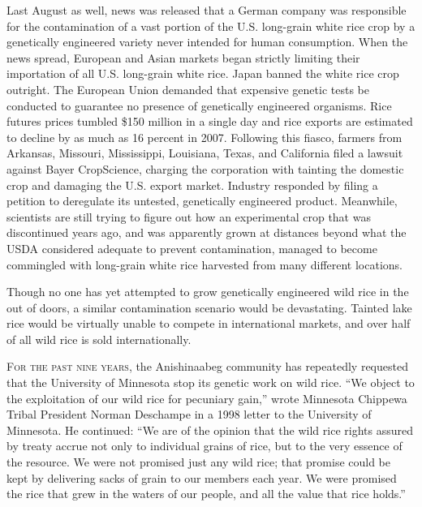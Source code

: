 Last August as well, news was released that a German company was
responsible for the contamination of a vast portion of the U.S.
long-grain white rice crop by a genetically engineered variety never
intended for human consumption. When the news spread, European and Asian
markets began strictly limiting their importation of all U.S. long-grain
white rice. Japan banned the white rice crop outright. The European
Union demanded that expensive genetic tests be conducted to guarantee no
presence of genetically engineered organisms. Rice futures prices
tumbled \$150 million in a single day and rice exports are estimated to
decline by as much as 16 percent in 2007. Following this fiasco, farmers
from Arkansas, Missouri, Mississippi, Louisiana, Texas, and California
filed a lawsuit against Bayer CropScience, charging the corporation with
tainting the domestic crop and damaging the U.S. export market. Industry
responded by filing a petition to deregulate its untested, genetically
engineered product. Meanwhile, scientists are still trying to figure out
how an experimental crop that was discontinued years ago, and was
apparently grown at distances beyond what the USDA considered adequate
to prevent contamination, managed to become commingled with long-grain
white rice harvested from many different locations.

Though no one has yet attempted to grow genetically engineered wild rice
in the out of doors, a similar contamination scenario would be
devastating. Tainted lake rice would be virtually unable to compete in
international markets, and over half of all wild rice is sold
internationally.


\textsc{For the past nine years}, the Anishinaabeg community has
repeatedly requested that the University of Minnesota stop its genetic
work on wild rice. ``We object to the exploitation of our wild rice for
pecuniary gain,'' wrote Minnesota Chippewa Tribal President Norman
Deschampe in a 1998 letter to the University of Minnesota. He continued:
``We are of the opinion that the wild rice rights assured by treaty
accrue not only to individual grains of rice, but to the very essence of
the resource. We were not promised just any wild rice; that promise
could be kept by delivering sacks of grain to our members each year. We
were promised the rice that grew in the waters of our people, and all
the value that rice holds.''

